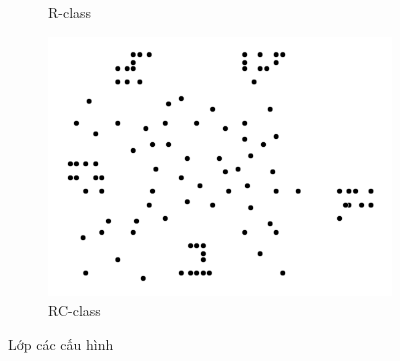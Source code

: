 \begin{figure}[H]
\begin{subfigure}{.3\textwidth}
    \caption{R-class}
    \label{fig:cls_r}
  \end{subfigure}
  \begin{subfigure}{.3\textwidth}
    \centering
    \includegraphics[width=1\linewidth]{figures/cls_rc.png}
    \caption{RC-class}
    \label{fig:cls_rc}
  \end{subfigure}
  \caption{Lớp các cấu hình}
\end{figure}

